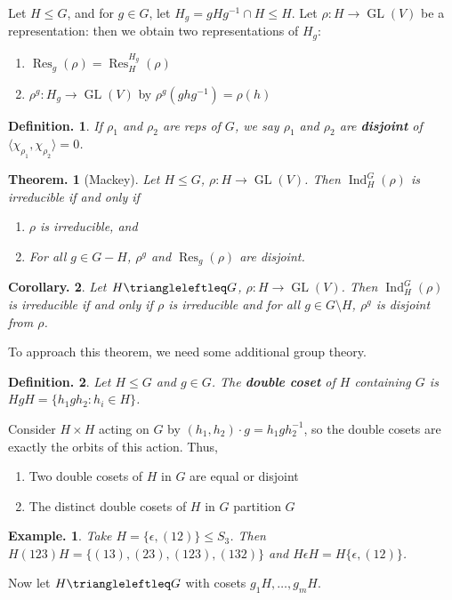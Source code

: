 \documentclass[11pt, a4paper]{memoir}
\theoremstyle{change}
\newtheorem{theorem}{Theorem.}[section]
\newtheorem{corollary}[theorem]{Corollary.}
\theoremstyle{plain}
\theoremstyle{nonumberplain}
\newtheorem{definition}{Definition.}
\newtheorem{example}{Example.}
\DeclareMathOperator{\GL}{GL}
\DeclareMathOperator{\Res}{Res}
\DeclareMathOperator{\Ind}{Ind}
\numberwithin{equation}{section}
\begin{document}
Let $H\leq G$, and for $g\in G$, let $H_g=gHg^{-1}\cap H\leq H$.
Let $\rho:H\to\GL(V)$ be a representation: then we obtain two representations of $H_g$:
\begin{enumerate}[nl]
    \item $\Res_g(\rho)=\Res_H^{H_g}(\rho)$
    \item $\rho^g:H_g\to\GL(V)$ by $\rho^g(ghg^{-1})=\rho(h)$
\end{enumerate}
\begin{definition}
    If $\rho_1$ and $\rho_2$ are reps of $G$, we say $\rho_1$ and $\rho_2$ are \textbf{disjoint} of $\langle\chi_{\rho_1},\chi_{\rho_2}\rangle=0$.
\end{definition}
\begin{theorem}[Mackey]
    Let $H\leq G$, $\rho:H\to\GL(V)$.
    Then $\Ind_H^G(\rho)$ is irreducible if and only if
    \begin{enumerate}[nl]
        \item $\rho$ is irreducible, and
        \item For all $g\in G-H$, $\rho^g$ and $\Res_g(\rho)$ are disjoint.
    \end{enumerate}
\end{theorem}
\begin{corollary}
    Let $H\triangleleftleq G$, $\rho:H\to\GL(V)$.
    Then $\Ind_H^G(\rho)$ is irreducible if and only if $\rho$ is irreducible and for all $g\in G\setminus H$, $\rho^g$ is disjoint from $\rho$.
\end{corollary}
To approach this theorem, we need some additional group theory.
\begin{definition}
    Let $H\leq G$ and $g\in G$.
    The \textbf{double coset} of $H$ containing $G$ is $HgH=\{h_1gh_2:h_i\in H\}$.
\end{definition}
Consider $H\times H$ acting on $G$ by $(h_1,h_2)\cdot g=h_1gh_2^{-1}$, so the double cosets are exactly the orbits of this action.
Thus,
\begin{enumerate}[nl]
    \item Two double cosets of $H$ in $G$ are equal or disjoint
    \item The distinct double cosets of $H$ in $G$ partition $G$
\end{enumerate}
\begin{example}
    Take $H=\{\epsilon,(12)\}\leq S_3$.
    Then $H(123)H=\{(13),(23),(123),(132)\}$ and $H\epsilon H=H\{\epsilon,(12)\}$.
\end{example}
Now let $H\triangleleftleq G$ with cosets $g_1H,\ldots,g_mH$.
\end{document}
